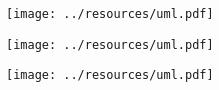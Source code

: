 \documentclass[a3paper, draft, simple, portrait, nocolumnxxvi]{eskdgraph}
\begin{document}
\begin{figure}
    \centering
    \texttt{[image: ../resources/uml.pdf]}
\end{figure}
\begin{figure}[b]
    \centering
    \texttt{[image: ../resources/uml.pdf]}
\end{figure}
\begin{figure}[b]
    \centering
    \texttt{[image: ../resources/uml.pdf]}
\end{figure}
\end{document}
